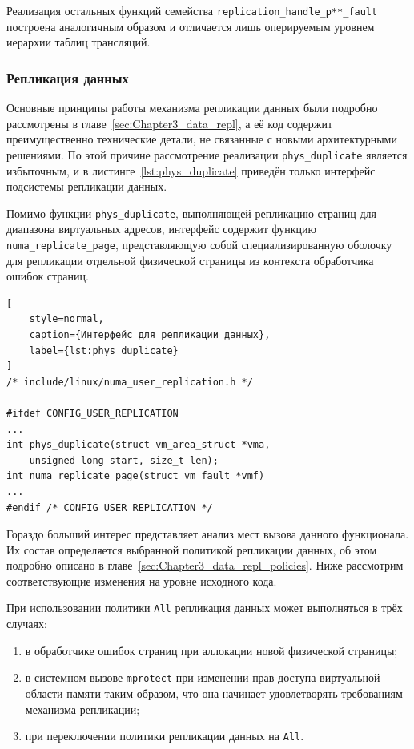 Реализация остальных функций семейства \texttt{replication\_handle\_p**\_fault} построена аналогичным образом и отличается лишь оперируемым уровнем иерархии таблиц трансляций.

\subsubsection{Репликация данных}

Основные принципы работы механизма репликации данных были подробно рассмотрены в главе~\ref{sec:Chapter3_data_repl}, а её код содержит преимущественно технические детали, не связанные с новыми архитектурными решениями. По этой причине рассмотрение реализации \texttt{phys\_duplicate} является избыточным, и в листинге~\ref{lst:phys_duplicate} приведён только интерфейс подсистемы репликации данных.

Помимо функции \texttt{phys\_duplicate}, выполняющей репликацию страниц для диапазона виртуальных адресов, интерфейс содержит функцию \texttt{numa\_replicate\_page}, представляющую собой специализированную оболочку для репликации отдельной физической страницы из контекста обработчика ошибок страниц.

\begin{lstlisting}[
	style=normal,
	caption={Интерфейс для репликации данных},
	label={lst:phys_duplicate}
]
/* include/linux/numa_user_replication.h */

#ifdef CONFIG_USER_REPLICATION
...
int phys_duplicate(struct vm_area_struct *vma,
	unsigned long start, size_t len);
int numa_replicate_page(struct vm_fault *vmf)
...
#endif /* CONFIG_USER_REPLICATION */
\end{lstlisting}

Гораздо больший интерес представляет анализ мест вызова данного функционала. Их состав определяется выбранной политикой репликации данных, об этом подробно описано в главе~\ref{sec:Chapter3_data_repl_policies}. Ниже рассмотрим соответствующие изменения на уровне исходного кода.

При использовании политики \texttt{All} репликация данных может выполняться в трёх случаях:
\begin{enumerate}
	\item в обработчике ошибок страниц при аллокации новой физической страницы;
	\item в системном вызове \texttt{mprotect} при изменении прав доступа виртуальной области памяти таким образом, что она начинает удовлетворять требованиям механизма репликации;
	\item при переключении политики репликации данных на \texttt{All}.
\end{enumerate}

